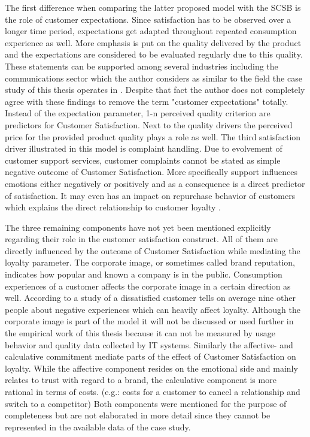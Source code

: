 The first difference when comparing the latter proposed model with the SCSB is the role of customer expectations. Since satisfaction has to be observed over a longer time period, expectations get adapted throughout repeated consumption experience as well. More emphasis is put on the quality delivered by the product and the expectations are considered to be evaluated regularly due to this quality. These statements can be supported among several industries including the communications sector which the author considers as similar to the field the case study of this thesis operates in \cite{johnson1996expectations} \cite{fornell1996american}. Despite that fact the author does not completely agree with these findings to remove the term "customer expectations" totally. Instead of the expectation parameter, 1-n perceived quality criterion are predictors for Customer Satisfaction. Next to the quality drivers the perceived price for the provided product quality plays a role as well. The third satisfaction driver illustrated in this model is complaint handling. Due to evolvement of customer support services, customer complaints cannot be stated as simple negative outcome of Customer Satisfaction. More specifically support influences emotions either negatively or positively and as a consequence is a direct predictor of satisfaction. It may even has an impact on repurchase behavior of customers which explains the direct relationship to customer loyalty \cite{johnson2001evolution}. 

The three remaining components have not yet been mentioned explicitly regarding their role in the customer satisfaction construct. All of them are directly influenced by the outcome of Customer Satisfaction while mediating the loyalty parameter. The corporate image, or sometimes called brand reputation, indicates how popular and known a company is in the public. Consumption experiences of a customer affects the corporate image in a certain direction as well. According to a study of \cite{hussain2015service} a dissatisfied customer tells on average nine other people about negative experiences which can heavily affect loyalty. Although the corporate image is part of the model it will not be discussed or used further in the empirical work of this thesis because it can not be measured by usage behavior and quality data collected by IT systems. Similarly the affective- and calculative commitment mediate parts of the effect of Customer Satisfaction on loyalty. While the affective component resides on the emotional side and mainly relates to trust with regard to a brand, the calculative component is more rational in terms of costs. (e.g.: costs for a customer to cancel a relationship and switch to a competitor) \cite{johnson2001evolution} Both components were mentioned for the purpose of completeness but are not elaborated in more detail since they cannot be represented in the available data of the case study. 

